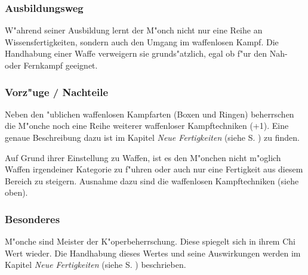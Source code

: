 \subsubsection{Ausbildungsweg}
\par W"ahrend seiner Ausbildung lernt der M"onch nicht nur eine Reihe an Wissensfertigkeiten, sondern auch den Umgang im waffenlosen Kampf. Die Handhabung einer Waffe verweigern sie grunds"atzlich, egal ob f"ur den Nah- oder Fernkampf geeignet.
\subsubsection{Vorz"uge / Nachteile}
\par Neben den "ublichen waffenlosen Kampfarten (Boxen und Ringen) beherrschen die M"onche noch eine Reihe weiterer waffenloser Kampftechniken (+1). Eine genaue Beschreibung dazu ist im Kapitel \textit{Neue Fertigkeiten} (siehe S. \pageref{neuefertigkeiten}) zu finden.
\par Auf Grund ihrer Einstellung zu Waffen, ist es den M"onchen nicht m"oglich Waffen irgendeiner Kategorie zu f"uhren oder auch nur eine Fertigkeit aus diesem Bereich zu steigern. Ausnahme dazu sind die waffenlosen Kampftechniken (siehe oben).
\subsubsection{Besonderes}
\par M"onche sind Meister der K"operbeherrschung. Diese spiegelt sich in ihrem Chi Wert wieder. Die Handhabung dieses Wertes und seine Auswirkungen werden im Kapitel \textit{Neue Fertigkeiten} (siehe S. \pageref{neuefertigkeiten}) beschrieben.
